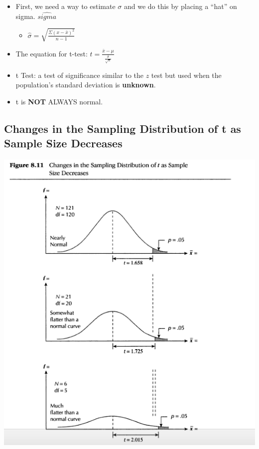 \documentclass[]{article}
\begin{document}
\begin{itemize}
\itemsep1pt\parskip0pt
\item
  First, we need a way to estimate $\sigma$ and we do this by placing a
  ``hat'' on sigma. $\hat{sigma}$

  \begin{itemize}
  \itemsep1pt\parskip0pt
  \item
    $\hat{\sigma} = \sqrt{\frac{\Sigma (x - \bar{x})^2}{n-1}}$
  \end{itemize}
\item
  The equation for t-test:
  $t=\frac{\bar{x}-\mu}{\frac{\hat{\sigma}}{\sqrt{n}}}$
\item
  t Test: a test of significance similar to the $z$ test but used when
  the population's standard deviation is \textbf{unknown}.
\item
  t is \textbf{NOT} ALWAYS normal.
\end{itemize}

\subsection{Changes in the Sampling Distribution of t as Sample Size
Decreases}\label{changes-in-the-sampling-distribution-of-t-as-sample-size-decreases}

\includegraphics{t_dist1.png}
\end{document}
